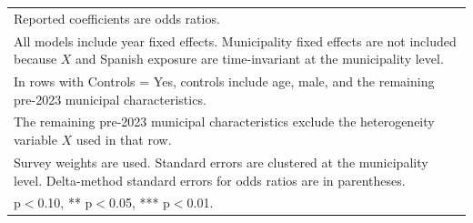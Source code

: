 \begin{table}[!htbp]
\begin{tabular}{llccr}
\multicolumn{5}{l}{\footnotesize Reported coefficients are odds ratios.} \\
\multicolumn{5}{l}{\footnotesize All models include year fixed effects. Municipality fixed effects are not included because $X$ and Spanish exposure are time-invariant at the municipality level.} \\
\multicolumn{5}{l}{\footnotesize In rows with Controls = Yes, controls include age, male, and the remaining pre-2023 municipal characteristics.} \\
\multicolumn{5}{l}{\footnotesize The remaining pre-2023 municipal characteristics exclude the heterogeneity variable $X$ used in that row.} \\
\multicolumn{5}{l}{\footnotesize Survey weights are used. Standard errors are clustered at the municipality level. Delta-method standard errors for odds ratios are in parentheses.} \\
\multicolumn{5}{l}{\footnotesize * p$<$0.10, ** p$<$0.05, *** p$<$0.01.} \\
\end{tabular}
\end{table}
